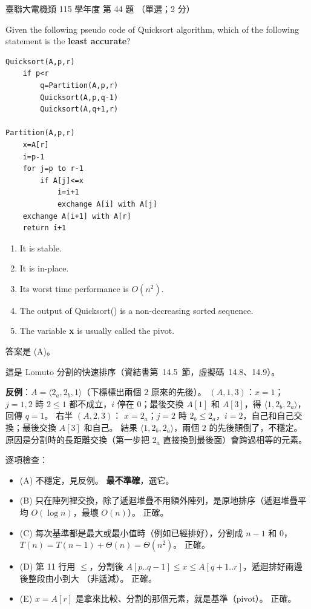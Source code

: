 \begin{pastexam}[label={px:ust-115-ee-ds-44}]{臺聯大電機類 115 學年度 第 44 題}
（單選；2 分）

Given the following pseudo code of Quicksort algorithm, which of the following statement is the
\textbf{least accurate}?
\begin{verbatim}
Quicksort(A,p,r)
    if p<r
        q=Partition(A,p,r)
        Quicksort(A,p,q-1)
        Quicksort(A,q+1,r)

Partition(A,p,r)
    x=A[r]
    i=p-1
    for j=p to r-1
        if A[j]<=x
            i=i+1
            exchange A[i] with A[j]
    exchange A[i+1] with A[r]
    return i+1
\end{verbatim}
\begin{enumerate}[label=(\Alph*)]
\item It is stable.
\item It is in-place.
\item Its worst time performance is $O(n^2)$.
\item The output of Quicksort() is a non-decreasing sorted sequence.
\item The variable \textbf{x} is usually called the pivot.
\end{enumerate}
\end{pastexam}

\begin{pastsoln}
答案是 (A)。

這是 Lomuto 分割的快速排序（資結書第~14.5~節，虛擬碼~14.8、14.9）。

\textbf{反例}：$A = \langle 2_a, 2_b, 1\rangle$（下標標出兩個 $2$ 原來的先後）。
$(A, 1, 3)$：$x = 1$；$j = 1, 2$ 時 $2 \le 1$ 都不成立，$i$ 停在 $0$；最後交換
$A[1]$ 和 $A[3]$，得 $\langle 1, 2_b, 2_a\rangle$，回傳 $q = 1$。 右半 $(A, 2, 3)$：
$x = 2_a$；$j = 2$ 時 $2_b \le 2_a$，$i = 2$，自己和自己交換；最後交換 $A[3]$ 和自己。 結果
$\langle 1, 2_b, 2_a\rangle$，兩個 $2$ 的先後顛倒了，不穩定。 原因是分割時的長距離交換（第一步把
$2_a$ 直接換到最後面）會跨過相等的元素。

逐項檢查：
\begin{itemize}
\item (A) 不穩定，見反例。 \textbf{最不準確}，選它。
\item (B) 只在陣列裡交換，除了遞迴堆疊不用額外陣列，是原地排序（遞迴堆疊平均 $O(\log n)$，最壞
$O(n)$）。 正確。
\item (C) 每次基準都是最大或最小值時（例如已經排好），分割成 $n - 1$ 和 $0$，
$T(n) = T(n-1) + \Theta(n) = \Theta(n^2)$。 正確。
\item (D) 第 11 行用 $\le$，分割後 $A[p..q-1] \le x \le A[q+1..r]$，遞迴排好兩邊後整段由小到大
（非遞減）。 正確。
\item (E) $x = A[r]$ 是拿來比較、分割的那個元素，就是基準（pivot）。 正確。
\end{itemize}
\end{pastsoln}
